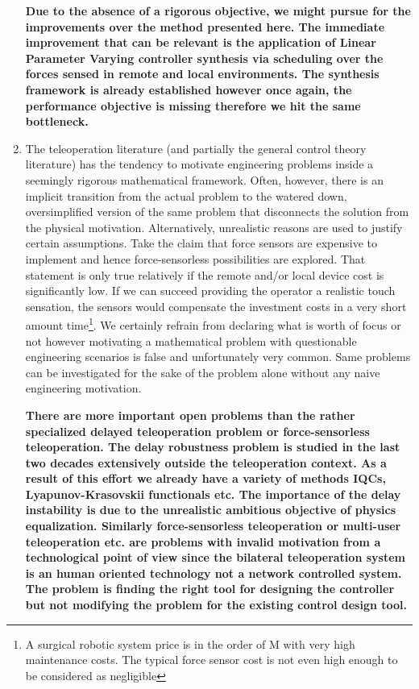 \begin{enumerate}
    {\bfseries Due to the absence of a rigorous objective, we might pursue for the improvements over the method presented here. The 
    immediate improvement that can be relevant is the application of Linear Parameter Varying controller synthesis via scheduling over the 
    forces sensed in remote and local environments. The synthesis framework is already established however once again, the performance 
    objective is missing therefore we hit the same bottleneck. 
    }
    \item The teleoperation literature (and partially the general control theory literature) has the tendency to motivate engineering 
    problems inside a seemingly rigorous mathematical framework. Often, however, there is an implicit transition from the actual problem to 
    the watered down, oversimplified version of the same problem that disconnects the solution from the physical motivation. Alternatively, 
    unrealistic reasons are used to justify certain assumptions. Take the claim that force sensors are expensive to implement and hence 
    force-sensorless possibilities are explored. That statement is only true relatively if the remote and/or local device cost is 
    significantly low. If we can succeed providing the operator a realistic touch sensation, the sensors would compensate the investment 
    costs in a very short amount time\footnote{A surgical robotic system price is in the order of M\EUR{} with very high maintenance 
    costs. The typical force sensor cost is not even high enough to be considered as negligible}. We certainly refrain from declaring what 
    is worth of focus or not however motivating a mathematical problem with questionable engineering scenarios is false and unfortunately 
    very common. Same problems can be investigated for the sake of the problem alone without any naive engineering motivation.
    
    {\bfseries There are more important open problems than the rather specialized delayed teleoperation problem or force-sensorless teleoperation.
    The delay robustness problem is studied in the last two decades extensively outside the teleoperation context. As a result of this 
    effort we already have a variety of methods IQCs, Lyapunov-Krasovskii functionals etc. The importance of the delay instability is due 
    to the unrealistic ambitious objective of physics equalization. Similarly force-sensorless teleoperation or multi-user teleoperation etc.
    are problems with invalid motivation from a technological point of view since the bilateral teleoperation system is an human oriented
    technology not a network controlled system. The problem is finding the right tool for designing the controller but not modifying the 
    problem for the existing control design tool.
    }
    
\end{enumerate}


